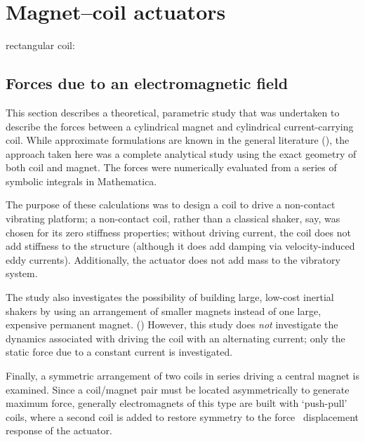 \chapter{Magnet--coil actuators}

rectangular coil: \textcite{rovers2010-ietm}

\section{Forces due to an electromagnetic field}

This section describes a theoretical, parametric study that was undertaken to
describe the forces between a cylindrical magnet and cylindrical
current-carrying coil. While approximate formulations are known in the general
literature (), the approach taken here was a complete
analytical study using the exact geometry of both coil and magnet. The
forces were numerically evaluated from a series of symbolic integrals in
Mathematica.

The purpose of these calculations was to design a coil to drive a non-contact
vibrating platform; a non-contact coil, rather than a classical shaker, say,
was chosen for its zero stiffness properties; without driving current, the
coil does not add stiffness to the structure (although it does add damping via
velocity-induced eddy currents). Additionally, the actuator does not add mass
to the vibratory system. 

The study also investigates the possibility of building large, low-cost
inertial shakers by using an arrangement of smaller magnets instead of one
large, expensive permanent magnet. () However, this study does \emph{not} investigate the dynamics
associated with driving the coil with an alternating current; only the static
force due to a constant current is investigated.


Finally, a symmetric arrangement of two coils in series driving a central
magnet is examined. Since a coil/magnet pair must be located asymmetrically to
generate maximum force, generally electromagnets of this type are built with
`push-pull' coils, where a second coil is added to restore symmetry to the
force \vs\  displacement response of the actuator.

